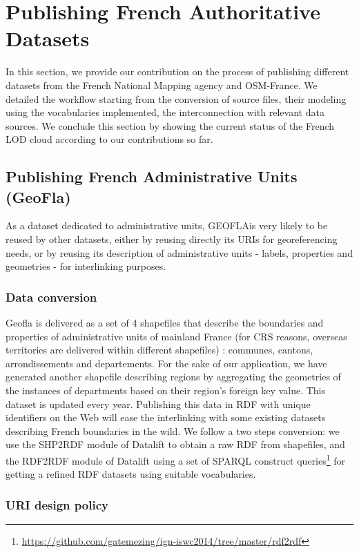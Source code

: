 \section{Publishing French Authoritative Datasets} \label{sec:publishing}

In this section, we provide our contribution on the process of publishing different datasets from the French National Mapping agency and OSM-France. We detailed the workflow starting from the conversion of source files, their modeling using the vocabularies implemented, the interconnection with relevant data sources. We conclude this section by showing the current status of the French LOD cloud according to our contributions so far.

\subsection{Publishing French Administrative Units (GeoFla)} \label{sec:geofla}
As a dataset dedicated to administrative units, GEOFLA\circledR is very likely to be reused by other datasets, either by reusing directly its URIs for georeferencing needs, or by reusing its description of administrative units - labels, properties and geometries - for interlinking purposes.

\subsubsection{Data conversion}
\label{sec:dconversion}
Geofla  is delivered as a set of 4 shapefiles  that describe the boundaries and properties of administrative units of mainland France (for CRS reasons, overseas territories are delivered within different shapefiles) : communes, cantons, arrondissements and departements. For the sake of our application, we have generated another shapefile describing regions by aggregating the geometries of the instances of departments based on their region's foreign key value. This  dataset is updated every year.  Publishing this data in RDF with unique identifiers on the Web will ease the interlinking with some existing datasets describing French boundaries in the wild. We follow a two steps conversion: we use the SHP2RDF module of Datalift to obtain a raw RDF from shapefiles, and the RDF2RDF module of Datalift  using a set of SPARQL construct queries\footnote{ \url{https://github.com/gatemezing/ign-iswc2014/tree/master/rdf2rdf}} for getting a refined RDF datasets using suitable vocabularies.

\subsubsection{URI design policy} \label{sec:urigeofla}

